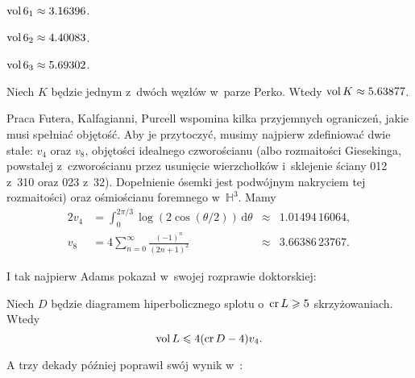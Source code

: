 \begin{example}
    $\operatorname{vol} 6_1 \approx 3.16396$.
\end{example}

\begin{example}
    $\operatorname{vol} 6_2 \approx 4.40083$.
\end{example}

\begin{example}
    $\operatorname{vol} 6_3 \approx 5.69302$.
\end{example}

\begin{example}
%
    Niech $K$ będzie jednym z~dwóch węzłów w~parze Perko.
    Wtedy $\operatorname{vol} K \approx 5.63877$.
\end{example}

Praca Futera, Kalfagianni, Purcell \cite{purcell19} wspomina kilka przyjemnych ograniczeń, jakie musi spełniać objętość.
%
%
%
Aby je przytoczyć, musimy najpierw zdefiniować dwie stałe: $v_4$ oraz $v_8$, objętości idealnego czworościanu (albo rozmaitości Giesekinga, powstałej z~czworościanu przez usunięcie  wierzchołków i~sklejenie ściany 012 z~310 oraz 023 z~32).
 Dopełnienie ósemki jest podwójnym nakryciem tej rozmaitości) oraz ośmiościanu foremnego w~$\mathbb H^3$.
%
Mamy
\begin{alignat}{2}
    v_4 & = \int_{0}^{2\pi/3} \log(2 \cos(\theta/2)) \,\mathrm{d}\theta & {}\approx{} & 1.01494\,16064, \\
    v_8 & = 4 \sum_{n=0}^\infty \frac{(-1)^n}{(2n+1)^2} &{}\approx{}& 3.66386\,23767.
\end{alignat}

I tak najpierw Adams \cite{adams83} pokazał w~swojej rozprawie doktorskiej:
%

\begin{proposition}
    Niech $D$ będzie diagramem hiperbolicznego splotu o~$\operatorname{cr} L \geqslant 5$ skrzyżowaniach.
    Wtedy
    \begin{equation}
        \operatorname{vol} L \leqslant 4 (\operatorname{cr} D - 4) v_4.
    \end{equation}
\end{proposition}

A trzy dekady później poprawił swój wynik w~\cite{adams13}:

